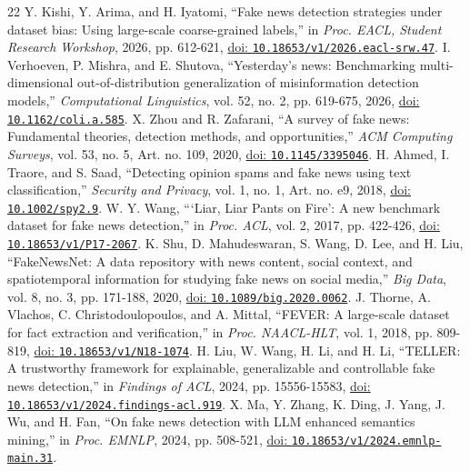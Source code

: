 \documentclass[conference]{IEEEtran}
\begin{document}
\begin{thebibliography}{22}
 Y. Kishi, Y. Arima, and H. Iyatomi, ``Fake news detection strategies under dataset bias: Using large-scale coarse-grained labels,'' in \emph{Proc. EACL, Student Research Workshop}, 2026, pp. 612-621, \href{https://doi.org/10.18653/v1/2026.eacl-srw.47}{doi: \nolinkurl{10.18653/v1/2026.eacl-srw.47}}.
 I. Verhoeven, P. Mishra, and E. Shutova, ``Yesterday's news: Benchmarking multi-dimensional out-of-distribution generalization of misinformation detection models,'' \emph{Computational Linguistics}, vol. 52, no. 2, pp. 619-675, 2026, \href{https://doi.org/10.1162/coli.a.585}{doi: \nolinkurl{10.1162/coli.a.585}}.
 X. Zhou and R. Zafarani, ``A survey of fake news: Fundamental theories, detection methods, and opportunities,'' \emph{ACM Computing Surveys}, vol. 53, no. 5, Art. no. 109, 2020, \href{https://doi.org/10.1145/3395046}{doi: \nolinkurl{10.1145/3395046}}.
 H. Ahmed, I. Traore, and S. Saad, ``Detecting opinion spams and fake news using text classification,'' \emph{Security and Privacy}, vol. 1, no. 1, Art. no. e9, 2018, \href{https://doi.org/10.1002/spy2.9}{doi: \nolinkurl{10.1002/spy2.9}}.
 W. Y. Wang, ```Liar, Liar Pants on Fire': A new benchmark dataset for fake news detection,'' in \emph{Proc. ACL}, vol. 2, 2017, pp. 422-426, \href{https://doi.org/10.18653/v1/P17-2067}{doi: \nolinkurl{10.18653/v1/P17-2067}}.
 K. Shu, D. Mahudeswaran, S. Wang, D. Lee, and H. Liu, ``FakeNewsNet: A data repository with news content, social context, and spatiotemporal information for studying fake news on social media,'' \emph{Big Data}, vol. 8, no. 3, pp. 171-188, 2020, \href{https://doi.org/10.1089/big.2020.0062}{doi: \nolinkurl{10.1089/big.2020.0062}}.
 J. Thorne, A. Vlachos, C. Christodoulopoulos, and A. Mittal, ``FEVER: A large-scale dataset for fact extraction and verification,'' in \emph{Proc. NAACL-HLT}, vol. 1, 2018, pp. 809-819, \href{https://doi.org/10.18653/v1/N18-1074}{doi: \nolinkurl{10.18653/v1/N18-1074}}.
 H. Liu, W. Wang, H. Li, and H. Li, ``TELLER: A trustworthy framework for explainable, generalizable and controllable fake news detection,'' in \emph{Findings of ACL}, 2024, pp. 15556-15583, \href{https://doi.org/10.18653/v1/2024.findings-acl.919}{doi: \nolinkurl{10.18653/v1/2024.findings-acl.919}}.
 X. Ma, Y. Zhang, K. Ding, J. Yang, J. Wu, and H. Fan, ``On fake news detection with LLM enhanced semantics mining,'' in \emph{Proc. EMNLP}, 2024, pp. 508-521, \href{https://doi.org/10.18653/v1/2024.emnlp-main.31}{doi: \nolinkurl{10.18653/v1/2024.emnlp-main.31}}.

\end{thebibliography}
\end{document}
